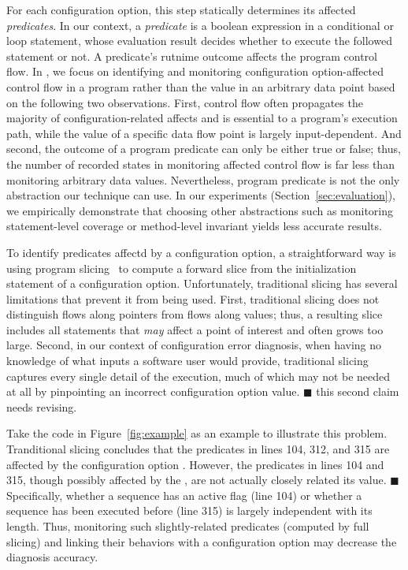 For each configuration option, this step statically determines
its affected \textit{predicates}. In our context, a \textit{predicate}
is a boolean expression in a conditional or loop statement, whose evaluation result
decides whether to execute the followed statement or not.
A predicate's rutnime outcome affects the program control flow.
In \ourtool, we focus on identifying and monitoring 
configuration option-affected control flow in a program
rather than the value in an arbitrary data point based on the
following two observations. First, control flow 
often propagates the majority of configuration-related affects
and is essential to a program's execution path, while
the value of a specific data flow point is largely input-dependent.
And second, the outcome of a program predicate can only be
either true or false; thus, the number of recorded states in monitoring
affected control flow is far less than monitoring arbitrary
data values.  Nevertheless, program predicate is not the only
abstraction our technique can use. In our experiments (Section~\ref{sec:evaluation}),
we empirically demonstrate that choosing other abstractions
such as monitoring statement-level coverage
or method-level invariant yields less accurate results.


To identify predicates affectd by a configuration option, a straightforward
way is using program slicing~\cite{Horwitz:1988} to compute
a forward slice from the initialization statement of a
configuration option. Unfortunately, traditional slicing has
several limitations that prevent it from being used.
First, traditional slicing does not distinguish flows along
pointers from flows along values; thus, a resulting slice includes all statements that
\textit{may} affect a point of interest and often grows too large. Second,
in our context of configuration error diagnosis,
when having no knowledge of what inputs a software user would provide,
traditional slicing captures every single detail of the execution,
much of which may not be needed at all by pinpointing an incorrect
configuration option value. $\blacksquare$ this second claim needs revising.

Take the code in Figure~\ref{fig:example} as an example to illustrate
this problem.  Tranditional slicing concludes that the predicates
in lines 104, 312, and 315 are affected by the configuration option .
However, the predicates in lines 104 and 315, though possibly
affected by the , are not actually closely related
its value. $\blacksquare$
Specifically, whether a sequence has an active flag (line 104) or
whether a sequence has been executed before (line 315)
is largely independent with its length. Thus, monitoring
such slightly-related predicates (computed by full slicing) and linking their behaviors with a
configuration option may decrease the diagnosis accuracy.

